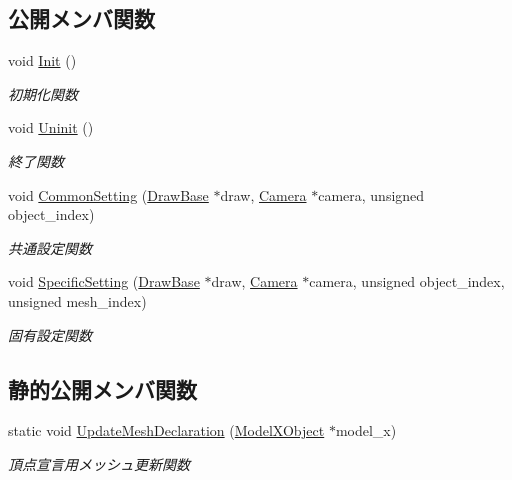 \subsection*{公開メンバ関数}
\begin{DoxyCompactItemize}
\item 
void \mbox{\hyperlink{class_vertex_shader_bump_mapping_a6c0f59d1f29fd883943a66bfe61b6b03}{Init}} ()
\begin{DoxyCompactList}\small\item\em 初期化関数 \end{DoxyCompactList}\item 
void \mbox{\hyperlink{class_vertex_shader_bump_mapping_abed4e0aa9655fa7a7a21e03d00e7c0e5}{Uninit}} ()
\begin{DoxyCompactList}\small\item\em 終了関数 \end{DoxyCompactList}\item 
void \mbox{\hyperlink{class_vertex_shader_bump_mapping_a7979584d035fff86d386c99617a8dd2c}{Common\+Setting}} (\mbox{\hyperlink{class_draw_base}{Draw\+Base}} $\ast$draw, \mbox{\hyperlink{class_camera}{Camera}} $\ast$camera, unsigned object\+\_\+index)
\begin{DoxyCompactList}\small\item\em 共通設定関数 \end{DoxyCompactList}\item 
void \mbox{\hyperlink{class_vertex_shader_bump_mapping_ad81d57336763441c4071f967b57dbce1}{Specific\+Setting}} (\mbox{\hyperlink{class_draw_base}{Draw\+Base}} $\ast$draw, \mbox{\hyperlink{class_camera}{Camera}} $\ast$camera, unsigned object\+\_\+index, unsigned mesh\+\_\+index)
\begin{DoxyCompactList}\small\item\em 固有設定関数 \end{DoxyCompactList}\end{DoxyCompactItemize}
\subsection*{静的公開メンバ関数}
\begin{DoxyCompactItemize}
\item 
static void \mbox{\hyperlink{class_vertex_shader_bump_mapping_a659d50e57533b9cd0204fc169985f1e0}{Update\+Mesh\+Declaration}} (\mbox{\hyperlink{class_model_x_object}{Model\+X\+Object}} $\ast$model\+\_\+x)
\begin{DoxyCompactList}\small\item\em 頂点宣言用メッシュ更新関数 \end{DoxyCompactList}\end{DoxyCompactItemize}

